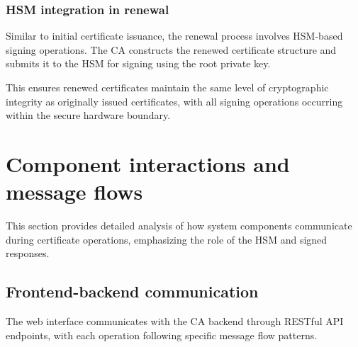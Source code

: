 \subsubsection{HSM integration in renewal}

Similar to initial certificate issuance, the renewal process involves HSM-based 
signing operations. The CA constructs the renewed certificate structure and 
submits it to the HSM for signing using the root private key.

This ensures renewed certificates maintain the same level of cryptographic 
integrity as originally issued certificates, with all signing operations 
occurring within the secure hardware boundary.

\section{Component interactions and message flows}

This section provides detailed analysis of how system components communicate during 
certificate operations, emphasizing the role of the HSM and signed responses.

\subsection{Frontend-backend communication}

The web interface communicates with the CA backend through RESTful API endpoints, 
with each operation following specific message flow patterns.

